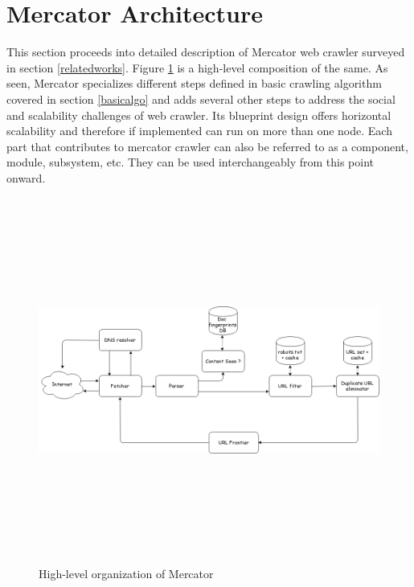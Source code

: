 \section{Mercator Architecture}\label{blueprint}
This section proceeds into detailed description of Mercator web crawler surveyed in section \ref{relatedworks}. Figure \ref{fig:basicarch} is a high-level composition of the same. As seen, Mercator specializes different steps defined in basic crawling
algorithm covered in section \ref{basicalgo} and adds several other steps to address
the social and scalability challenges of web crawler. Its blueprint design offers
horizontal scalability and therefore if implemented can run on more than one node.
Each part that contributes to mercator crawler can also be referred to as a
component, module, subsystem, etc. They can be used interchangeably from this point onward.

\begin{figure}[h!]
  \centering
  \includegraphics[width=15cm,height=12cm,keepaspectratio]{../media/crawler/basic-crawler-architecture-v2.png}
  \caption{High-level organization of Mercator}
  \label{fig:basicarch}
\end{figure}

